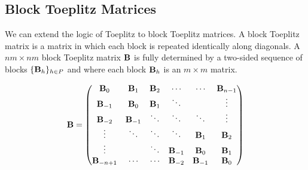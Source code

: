 





\subsection{Block Toeplitz Matrices}
\label{subsection:ch2-block_toeplitz_matrices}

We can extend the logic of Toeplitz to block Toeplitz matrices.
A block Toeplitz matrix is a matrix in which each block is repeated identically along diagonals.
A $nm\times nm$ block Toeplitz matrix $\mathbf{B}$ is fully determined by a two-sided sequence of blocks $\{\mathbf{B}_h\}_{h \in P}$ and where each block $\mathbf{B}_h$ is an $m \times m$ matrix.  

\begin{equation}
  \mathbf{B} =
  \begin{pmatrix}
    \mathbf{B}_0 & \mathbf{B}_{1}   & \mathbf{B}_{2} & \cdots & \cdots & \mathbf{B}_{n-1}  \\
    \mathbf{B}_{-1} & \mathbf{B}_0 & \mathbf{B}_{1} & \ddots & & \vdots \\
    \mathbf{B}_{-2} & \mathbf{B}_{-1} & \ddots & \ddots & \ddots & \vdots \\ 
   \vdots & \ddots & \ddots & \ddots & \mathbf{B}_{1} & \mathbf{B}_{2}\\
   \vdots & & \ddots & \mathbf{B}_{-1} & \mathbf{B}_{0} & \mathbf{B}_{1} \\
  \mathbf{B}_{-n+1} & \cdots & \cdots & \mathbf{B}_{-2} & \mathbf{B}_{-1} & \mathbf{B}_0
  \end{pmatrix}
\end{equation}

